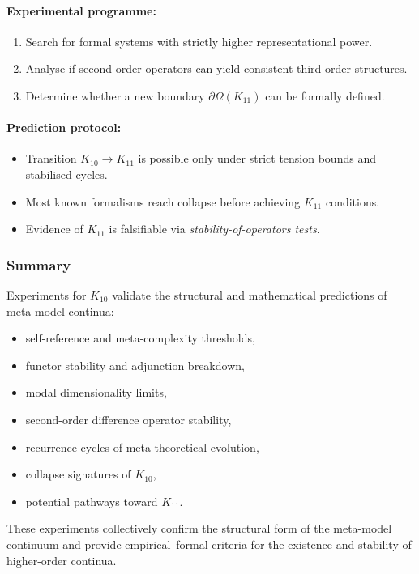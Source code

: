 \paragraph{Experimental programme:}

\begin{enumerate}
    \item Search for formal systems with strictly higher 
          representational power.
    \item Analyse if second-order operators can yield consistent 
          third-order structures.
    \item Determine whether a new boundary $\partial\Omega(K_{11})$ can 
          be formally defined.
\end{enumerate}

\paragraph{Prediction protocol:}

\begin{itemize}
    \item Transition $K_{10} \to K_{11}$ is possible only under 
          strict tension bounds and stabilised cycles.
    \item Most known formalisms reach collapse before achieving 
          $K_{11}$ conditions.
    \item Evidence of $K_{11}$ is falsifiable via 
          \emph{stability-of-operators tests}.
\end{itemize}



\subsubsection{Summary}

Experiments for $K_{10}$ validate the structural and mathematical 
predictions of meta-model continua:

\begin{itemize}
    \item self-reference and meta-complexity thresholds,
    \item functor stability and adjunction breakdown,
    \item modal dimensionality limits,
    \item second-order difference operator stability,
    \item recurrence cycles of meta-theoretical evolution,
    \item collapse signatures of $K_{10}$,
    \item potential pathways toward $K_{11}$.
\end{itemize}

These experiments collectively confirm the structural form of the 
meta-model continuum and provide empirical–formal criteria for the 
existence and stability of higher-order continua.
